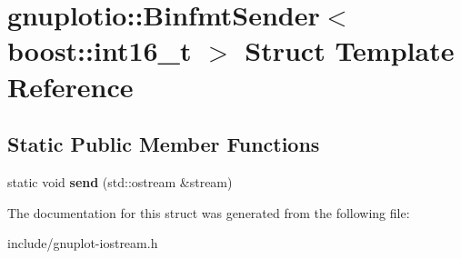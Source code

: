 \hypertarget{structgnuplotio_1_1BinfmtSender_3_01boost_1_1int16__t_01_4}{}\section{gnuplotio\+:\+:Binfmt\+Sender$<$ boost\+:\+:int16\+\_\+t $>$ Struct Template Reference}
\label{structgnuplotio_1_1BinfmtSender_3_01boost_1_1int16__t_01_4}
\subsection*{Static Public Member Functions}
\begin{DoxyCompactItemize}
\item 
\mbox{\label{structgnuplotio_1_1BinfmtSender_3_01boost_1_1int16__t_01_4_a6d3c1b829c9196fa9d1f53bd78a90e34}} 
static void {\bfseries send} (std\+::ostream \&stream)
\end{DoxyCompactItemize}


The documentation for this struct was generated from the following file\+:\begin{DoxyCompactItemize}
\item 
include/gnuplot-\/iostream.\+h\end{DoxyCompactItemize}
